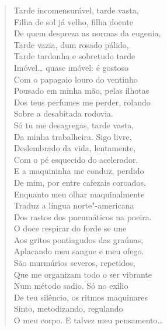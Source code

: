 {\begin{verse}
Tarde incomensurável, tarde vasta,\\
Filha de sol já velho, filha doente\\
De quem despreza as normas da eugenia,\\
Tarde vazia, dum rosado pálido,\\
Tarde tardonha e sobretudo tarde\\
Imóvel\ldots{} quase imóvel: é gostoso\\
Com o papagaio louro do ventinho\\
Pousado em minha mão, pelas ilhotas\\
Dos teus perfumes me perder, rolando\\
Sobre a desabitada rodovia.\\
Só tu me desagregas, tarde vasta,\\
Da minha trabalheira. Sigo livre,\\
Deslembrado da vida, lentamente,\\
Com o pé esquecido do acelerador.\\
E a maquininha me conduz, perdido\\
De mim, por entre cafezais coroados,\\
Enquanto meu olhar maquinalmente\\
Traduz a língua norte"-americana\\
Dos rastos dos pneumáticos na poeira.\\
O doce respirar do forde se une\\
Aos gritos pontiagudos das graúnas,\\
Aplacando meu sangue e meu ofego.\\
São murmúrios severos, repetidos,\\
Que me organizam todo o ser vibrante\\
Num método sadio. Só no exílio\\
De teu silêncio, os ritmos maquinares\\
Sinto, metodizando, regulando\\
O meu corpo. E talvez meu pensamento\ldots{}


\end{verse}}
